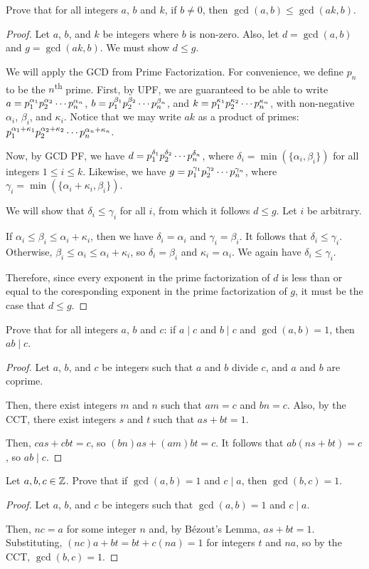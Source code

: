 \documentclass{agony}
\begin{document}
\question Prove that for all integers $a$, $b$ and $k$, if $b \neq 0$, then $\gcd(a, b) \leq \gcd(ak, b)$.
\begin{proof}
  Let $a$, $b$, and $k$ be integers where $b$ is non-zero.
  Also, let $d=\gcd(a,b)$ and $g=\gcd(ak,b)$. We must show $d \leq g$.

  We will apply the GCD from Prime Factorization.
  For convenience, we define $p_n$ to be the $n$\textsuperscript{th} prime.
  First, by UPF, we are guaranteed to be able to write
  $a=\pf{\alpha_#1}{n}$, $b=\pf{\beta_#1}{n}$, and $k=\pf{\kappa_#1}{n}$,
  with non-negative $\alpha_i$, $\beta_i$, and $\kappa_i$.
  Notice that we may write $ak$ as a product of primes: $\pf{\alpha_#1+\kappa_#1}{n}$.

  Now, by GCD PF, we have $d=\pf{\delta_#1}{n}$, where $\delta_i=\min(\{\alpha_i,\beta_i\})$
  for all integers $1 \leq i \leq k$.
  Likewise, we have $g=\pf{\gamma_#1}{n}$, where $\gamma_i=\min(\{\alpha_i+\kappa_i,\beta_i\})$.

  We will show that $\delta_i \leq \gamma_i$ for all $i$, from which it follows $d \leq g$.
  Let $i$ be arbitrary.

  If $\alpha_i \leq \beta_i \leq \alpha_i+\kappa_i$,
  then we have $\delta_i = \alpha_i$ and $\gamma_i = \beta_i$.
  It follows that $\delta_i\leq\gamma_i$.
  Otherwise, $\beta_i \leq \alpha_i \leq \alpha_i + \kappa_i$,
  so $\delta_i = \beta_i$ and $\kappa_i = \alpha_i$.
  We again have $\delta_i\leq\gamma_i$.

  Therefore, since every exponent in the prime factorization of $d$ is less than or equal to
  the coresponding exponent in the prime factorization of $g$, it must be the case that $d \leq g$.
\end{proof}


\question Prove that for all integers $a$, $b$ and $c$:
if $a \mid c$ and $b \mid c$ and $\gcd(a, b) = 1$, then $ab \mid c$.
\begin{proof}
  Let $a$, $b$, and $c$ be integers such that $a$ and $b$ divide $c$, and $a$ and $b$ are coprime.

  Then, there exist integers $m$ and $n$ such that $am=c$ and $bn=c$.
  Also, by the CCT, there exist integers $s$ and $t$ such that $as+bt=1$.

  Then, $cas+cbt=c$, so $(bn)as+(am)bt=c$.
  It follows that $ab(ns+bt)=c$, so $ab \mid c$.
\end{proof}


\question Let $a,b,c\in\mathbb{Z}$. Prove that if $\gcd(a, b) = 1$ and $c \mid a$, then $\gcd(b, c) = 1$.
\begin{proof}
  Let $a$, $b$, and $c$ be integers such that $\gcd(a,b)=1$ and $c \mid a$.

  Then, $nc = a$ for some integer $n$ and, by Bézout's Lemma, $as+bt=1$.
  Substituting, $(nc)a+bt=bt+c(na)=1$ for integers $t$ and $na$, so by the CCT, $\gcd(b,c)=1$.
\end{proof}
\end{document}
